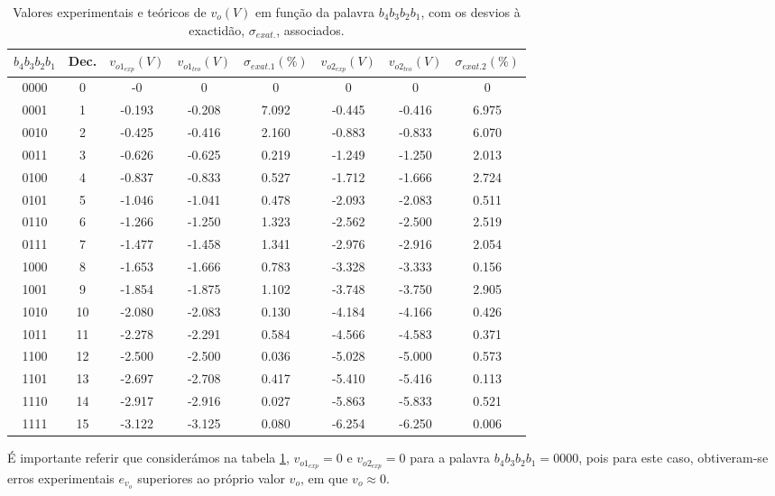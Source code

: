 \documentclass[a4paper,11pt]{report}
\begin{document}
\begin{table}[h]
\centering
\begin{tabular}{ || c| c || c | c | c|| c | c | c || }
\hline
	$b_4b_3b_2b_1$ & Dec. & $v_{o1_{exp}}(V)$ & $v_{o1_{teo}}(V)$& $\sigma_{exat.1}(\%)$ & $v_{o2_{exp}}(V)$ & $v_{o2_{teo}}(V)$ & $\sigma_{exat.2}(\%)$\\ \hline\hline
	0000 & 0 & -0 & 0 & 0 & 0 & 0 & 0 \\ \hline
	0001 & 1 & -0.193 & -0.208 & 7.092 & -0.445 & -0.416 & 6.975 \\ \hline
	0010 & 2 & -0.425 & -0.416 & 2.160& -0.883& -0.833 & 6.070\\ \hline
	0011 & 3 & -0.626 & -0.625 & 0.219 & -1.249& -1.250 & 2.013\\ \hline
	0100 & 4 & -0.837 & -0.833 & 0.527 & -1.712& -1.666 & 2.724\\ \hline
	0101 & 5 & -1.046 & -1.041 & 0.478 & -2.093& -2.083 & 0.511 \\ \hline
	0110 & 6 & -1.266 & -1.250 & 1.323& -2.562 & -2.500 & 2.519\\ \hline
	0111 & 7 & -1.477 & -1.458 & 1.341 & -2.976 & -2.916 & 2.054 \\ \hline
	1000 & 8 & -1.653 & -1.666 & 0.783 & -3.328 & -3.333 & 0.156 \\ \hline
	1001 & 9 & -1.854 & -1.875 & 1.102 & -3.748 & -3.750 & 2.905\\ \hline
	1010 & 10 & -2.080 & -2.083 & 0.130 & -4.184 & -4.166 & 0.426\\ \hline
	1011 & 11 & -2.278 & -2.291 & 0.584 & -4.566 & -4.583 & 0.371\\ \hline
	1100 & 12 & -2.500 & -2.500 & 0.036 & -5.028 & -5.000 & 0.573 \\ \hline
	1101 & 13 & -2.697 & -2.708 & 0.417 & -5.410 & -5.416 & 0.113\\ \hline
	1110 & 14 & -2.917 & -2.916 & 0.027& -5.863 & -5.833 & 0.521 \\ \hline
	1111 & 15 & -3.122 & -3.125 & 0.080 & -6.254 & -6.250 & 0.006 \\ \hline
\end{tabular}

\caption{Valores experimentais e teóricos de $v_o(V)$ em função da palavra $b_4b_3b_2b_1$, com os desvios à exactidão, $\sigma_{exat.}$, associados.\label{tab:comp}}
\end{table}

 É importante referir que considerámos na tabela \ref{tab:comp}, $v_{o1_{exp}}=0$ e $v_{o2_{exp}}=0$ para a palavra $b_4b_3b_2b_1=0000$, pois para este caso, obtiveram-se erros experimentais $e_{v_o}$ superiores ao próprio valor $v_o$, em que $v_o\approx0$.
 
\end{document}
